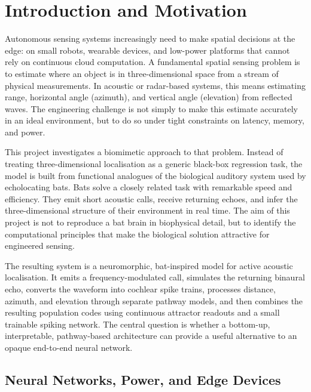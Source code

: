 \chapter{Introduction and Motivation}


Autonomous sensing systems increasingly need to make spatial decisions at the edge: on small robots, wearable devices, and low-power platforms that cannot rely on continuous cloud computation. A fundamental spatial sensing problem is to estimate where an object is in three-dimensional space from a stream of physical measurements. In acoustic or radar-based systems, this means estimating range, horizontal angle (azimuth), and vertical angle (elevation) from reflected waves. The engineering challenge is not simply to make this estimate accurately in an ideal environment, but to do so under tight constraints on latency, memory, and power.


This project investigates a biomimetic approach to that problem. Instead of treating three-dimensional localisation as a generic black-box regression task, the model is built from functional analogues of the biological auditory system used by echolocating bats. Bats solve a closely related task with remarkable speed and efficiency. They emit short acoustic calls, receive returning echoes, and infer the three-dimensional structure of their environment in real time. The aim of this project is not to reproduce a bat brain in biophysical detail, but to identify the computational principles that make the biological solution attractive for engineered sensing.

The resulting system is a neuromorphic, bat-inspired model for active acoustic localisation. It emits a frequency-modulated call, simulates the returning binaural echo, converts the waveform into cochlear spike trains, processes distance, azimuth, and elevation through separate pathway models, and then combines the resulting population codes using continuous attractor readouts and a small trainable spiking network. The central question is whether a bottom-up, interpretable, pathway-based architecture can provide a useful alternative to an opaque end-to-end neural network.


\section{Neural Networks, Power, and Edge Devices}

